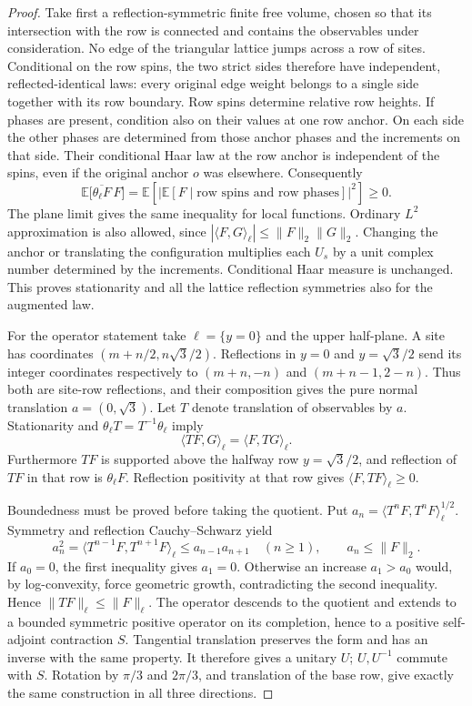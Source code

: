 \documentclass[11pt]{article}
\newcommand{\E}{\mathbb E}
\theoremstyle{definition}
\theoremstyle{remark}
\numberwithin{equation}{section}
\begin{document}
\begin{proof}
Take first a reflection-symmetric finite free volume, chosen so that its
intersection with the row is connected and contains the observables under
consideration.  No edge of the triangular lattice jumps across a row of
sites.  Conditional on the row spins, the two strict sides therefore have
independent, reflected-identical laws: every original edge weight belongs
to a single side together with its row boundary.  Row spins determine
relative row heights.  If phases are present, condition also on their
values at one row anchor.  On each side the other phases are determined
from those anchor phases and the increments on that side.  Their
conditional Haar law at the row anchor is independent of the spins, even
if the original anchor $o$ was elsewhere.  Consequently
\[
 \E\big[\overline{\theta_\ell F}\,F\big]
   =\E\left[\left|\E[F\mid\text{row spins and row phases}]\right|^2\right]
   \ge0.
\]
The plane limit gives the same inequality for local functions.  Ordinary
$L^2$ approximation is also allowed, since
$|\langle F,G\rangle_\ell|\le\|F\|_2\|G\|_2$.
Changing the anchor or translating the configuration multiplies each
$U_s$ by a unit complex number determined by the increments.  Conditional
Haar measure is unchanged.  This proves stationarity and all the lattice
reflection symmetries also for the augmented law.

For the operator statement take $\ell=\{y=0\}$ and the upper half-plane.
A site has coordinates $(m+n/2,n\sqrt3/2)$.  Reflections in $y=0$ and
$y=\sqrt3/2$ send its integer coordinates respectively to
$(m+n,-n)$ and $(m+n-1,2-n)$.  Thus both are site-row reflections, and their
composition gives the pure normal translation $a=(0,\sqrt3)$.
Let $T$ denote translation of observables by $a$.  Stationarity and
$\theta_\ell T=T^{-1}\theta_\ell$ imply
\[
 \langle TF,G\rangle_\ell=\langle F,TG\rangle_\ell.
\]
Furthermore $TF$ is supported above the halfway row $y=\sqrt3/2$, and
reflection of $TF$ in that row is $\theta_\ell F$.  Reflection positivity
at that row gives $\langle F,TF\rangle_\ell\ge0$.

Boundedness must be proved before taking the quotient.  Put
$a_n=\langle T^nF,T^nF\rangle_\ell^{1/2}$.  Symmetry and reflection
Cauchy--Schwarz yield
\[
 a_n^2=\langle T^{n-1}F,T^{n+1}F\rangle_\ell
       \le a_{n-1}a_{n+1}\quad(n\ge1),
 \qquad a_n\le\|F\|_2.
\]
If $a_0=0$, the first inequality gives $a_1=0$.  Otherwise an increase
$a_1>a_0$ would, by log-convexity, force geometric growth, contradicting
the second inequality.  Hence $\|TF\|_\ell\le\|F\|_\ell$.
The operator descends to the quotient and extends to a bounded symmetric
positive operator on its completion, hence to a positive self-adjoint
contraction $S$.  Tangential translation preserves the form and has an
inverse with the same property.  It therefore gives a unitary $U$;
$U,U^{-1}$ commute with $S$.  Rotation by $\pi/3$ and $2\pi/3$, and
translation of the base row, give exactly the same construction in all
three directions.
\end{proof}
\end{document}
